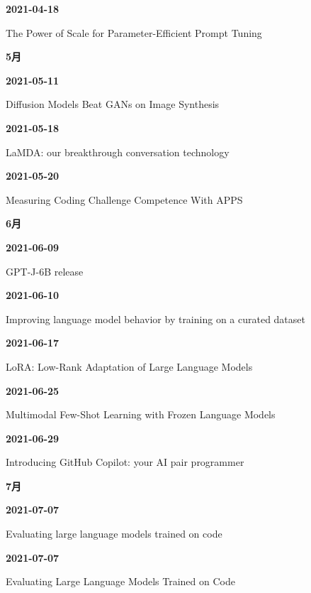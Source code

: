 \smallskip
\noindent\textbf{2021-04-18}\par
{\raggedright The Power of Scale for Parameter-Efficient Prompt Tuning\,\cite{src-c1ad400391c9}\par}
\smallskip
\medskip
\noindent\textbf{5月}\par
\smallskip
\noindent\textbf{2021-05-11}\par
{\raggedright Diffusion Models Beat GANs on Image Synthesis\,\cite{src-11a149a699a0}\par}
\smallskip
\noindent\textbf{2021-05-18}\par
{\raggedright LaMDA: our breakthrough conversation technology\,\cite{src-a3971b3f646f}\par}
\smallskip
\noindent\textbf{2021-05-20}\par
{\raggedright Measuring Coding Challenge Competence With APPS\,\cite{chron-f3e0696d571a}\par}
\smallskip
\medskip
\noindent\textbf{6月}\par
\smallskip
\noindent\textbf{2021-06-09}\par
{\raggedright GPT-J-6B release\,\cite{src-1b063a3564f3}\par}
\smallskip
\noindent\textbf{2021-06-10}\par
{\raggedright Improving language model behavior by training on a curated dataset\,\cite{chron-49090b5da7f8}\par}
\smallskip
\noindent\textbf{2021-06-17}\par
{\raggedright LoRA: Low-Rank Adaptation of Large Language Models\,\cite{src-ab9d63ddee6e}\par}
\smallskip
\noindent\textbf{2021-06-25}\par
{\raggedright Multimodal Few-Shot Learning with Frozen Language Models\,\cite{chron-df57e7152a35}\par}
\smallskip
\noindent\textbf{2021-06-29}\par
{\raggedright Introducing GitHub Copilot: your AI pair programmer\,\cite{src-089fe2c6fbb1}\par}
\smallskip
\medskip
\noindent\textbf{7月}\par
\smallskip
\noindent\textbf{2021-07-07}\par
{\raggedright Evaluating large language models trained on code\,\cite{src-47d0c87b08f0}\par}
\smallskip
\noindent\textbf{2021-07-07}\par
{\raggedright Evaluating Large Language Models Trained on Code\,\cite{src-890a73c0b288}\par}
